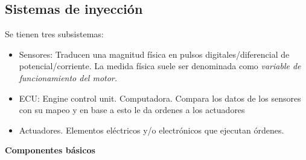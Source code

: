 \subsection{Sistemas de inyección}
Se tienen tres subsistemas:
\begin{itemize}
    \item Sensores: Traducen una magnitud física en pulsos digitales/diferencial de potencial/corriente. La medida física suele ser denominada como {\it variable de funcionamiento del motor.}
    \item ECU: Engine control unit. Computadora. Compara los datos de los sensores con su mapeo y en base a esto le da ordenes a los actuadores
    \item Actuadores. Elementos eléctricos y/o electrónicos que ejecutan órdenes.
\end{itemize}
{\bf Componentes básicos}
